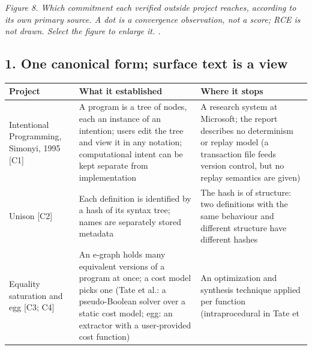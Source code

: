 \documentclass[10pt,letterpaper]{article}
\begin{document}
\emph{Figure 8. Which commitment each verified outside project reaches,
according to its own primary source. A dot is a convergence observation,
not a score; RCE is not drawn. Select the figure to enlarge it. .}

\subsection{1. One canonical form; surface text is a
view}\label{one-canonical-form-surface-text-is-a-view}

{\footnotesize\setlength{\tabcolsep}{3.8pt}\renewcommand{\arraystretch}{1.15}
\begin{longtable}[]{@{}
  >{\raggedright\arraybackslash}p{}
  >{\raggedright\arraybackslash}p{}
  >{\raggedright\arraybackslash}p{}@{}}
\toprule\noalign{}
\begin{minipage}[b]{\linewidth}\raggedright
\textbf{Project}
\end{minipage} & \begin{minipage}[b]{\linewidth}\raggedright
\textbf{What it established}
\end{minipage} & \begin{minipage}[b]{\linewidth}\raggedright
\textbf{Where it stops}
\end{minipage} \\
\midrule\noalign{}
\endhead
\bottomrule\noalign{}
\endlastfoot
Intentional Programming, Simonyi, 1995 {[}C1{]} & A program is a tree of
nodes, each an instance of an intention; users edit the tree and view it
in any notation; computational intent can be kept separate from
implementation & A research system at Microsoft; the report describes no
determinism or replay model (a transaction file feeds version control,
but no replay semantics are given) \\
Unison {[}C2{]} & Each definition is identified by a hash of its syntax
tree; names are separately stored metadata & The hash is of structure:
two definitions with the same behaviour and different structure have
different hashes \\
Equality saturation and egg {[}C3; C4{]} & An e-graph holds many
equivalent versions of a program at once; a cost model picks one (Tate
et al.: a pseudo-Boolean solver over a static cost model; egg: an
extractor with a user-provided cost function) & An optimization and
synthesis technique applied per function (intraprocedural in Tate et

\end{longtable}}
\end{document}
